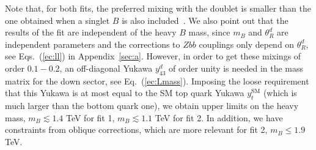 \documentclass[12pt,a4paper]{article}
\begin{document}
Note that, for both fits, the preferred mixing with the doublet is smaller than the one obtained when a singlet $B$ is also included~\cite{Choudhury:2001hs,Batell:2012ca}.
We also point out that the results of the fit are independent of the heavy $B$ mass, since $m_B$ and $\theta_R^d$ are independent parameters and the corrections to $Zbb$ couplings only depend on $\theta_R^d$, see Eqs.~(\ref{ec:ll}) in Appendix~\ref{sec:a}. However, in order to get these mixings of order $0.1-0.2$, an off-diagonal Yukawa $y_{43}^d$ of order unity is needed in the mass matrix for the down sector, see Eq.~(\ref{ec:Lmass}). Imposing the loose requirement that this Yukawa is at most equal to the SM top quark Yukawa $y_t^\text{SM}$ (which is much larger than the bottom quark one), we obtain upper limits on the heavy mass, $m_B \lesssim 1.4$ TeV for fit 1, $m_B \lesssim 1.1$ TeV for fit 2. In addition, we have constraints from oblique corrections, which are more relevant for fit 2, $m_B \leq 1.9$ TeV.
\end{document}
